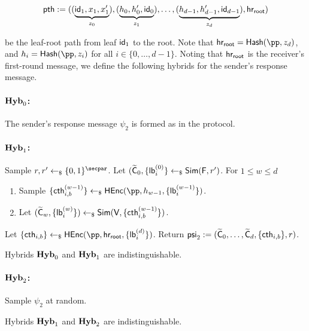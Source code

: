 \begin{equation}\label{EQ:Path}
    \mathsf{pth} :=  ((\underbrace{\mathsf{id}_1 , x_1 , x'_1}_{z_0}) , (\underbrace{h_0 , h'_0, \mathsf{id}_0}_{z_1}) ,    \dots , (\underbrace{h_{d-1} , h'_{d-1}, \mathsf{id}_{d-1}}_{z_{d}}) , \mathsf{hr_{root}})
\end{equation}



be the leaf-root path from leaf $\mathsf{id}_1$ to the root. Note that $\hr = \Hash(\pp, z_d)$, and $h_i = \Hash(\pp, z_{i})$ for all $i \in \{0, \dots, d-1\}$. Noting that $\mathsf{hr_{root}}$ is the receiver's first-round message, we define the following hybrids for the sender's response message.

\paragraph{$\mathsf{\mathbf{Hyb}}_0$:} The sender's response message $\psi_2$ is formed as in the protocol.

\paragraph{$\mathsf{\mathbf{Hyb}}_1$:}  Sample $r, r' \pick \bits^\secpar$.  Let $(\widetilde{\mathsf{C}}_0 , \{\mathsf{lb}_i^{(0)} \} \leftarrow_\$ \mathsf{Sim}(\mathsf{F} , r')$. For $1 \leq w \leq d$

\begin{enumerate}
    \item  Sample $\{\cth^{(w-1)}_{i,b}\} \pick \HEnc(\pp , h_{w-1} , \{\lb_i^{(w-1)} \}  )$.
    \item  Let  $(\widetilde{\mathsf{C}}_w , \{\mathsf{lb}_{i}^{(w)} \}) \leftarrow_\$ \mathsf{Sim}(\mathsf{V} , \{\mathsf{cth}_{i,b}^{(w-1)}\})$.
\end{enumerate}
 Let $\{\cth_{i,b} \} \pick \HEnc(\pp, \hr, \{\lb_{i}^{(d)} \} )$. Return $\mathsf{psi}_2 := (\widetilde{\mathsf{C}}_0, \dots , \widetilde{\mathsf{C}}_{d} , \{\mathsf{cth}_{i,b} \} , r)$.


\begin{lemma}\label{Lemma:GCHyb1}
    Hybrids $\mathsf{\mathbf{Hyb}}_0$ and  $\mathsf{\mathbf{Hyb}}_1$ are indistinguishable. %
\end{lemma}

\paragraph{$\mathsf{\mathbf{Hyb}}_2$:} Sample $\psi_2$ at random.




   
   
   
\begin{lemma}\label{Lemma:GCHyb2}
   Hybrids  $\mathsf{\mathbf{Hyb}}_1$ and $\mathsf{\mathbf{Hyb}}_2$ are indistinguishable.
\end{lemma}

